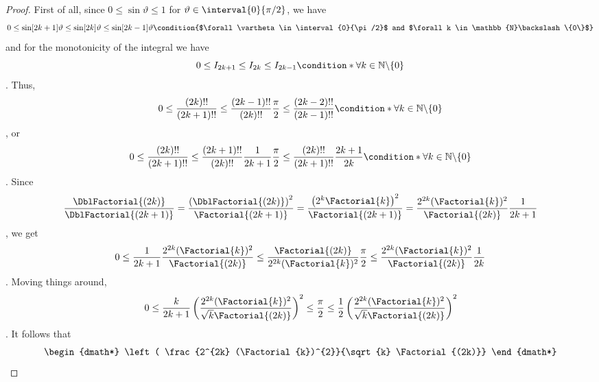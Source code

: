 \documentclass[onecolumn,a4paper,11pt]{article}
\newcommand{\numberset}{\mathbb}
\providecommand{\N}{\numberset{N}}
\theoremstyle{classicdef}
\theoremstyle{remark}
\begin{document}
\begin{proof}
First of all, since $0 \leq \sin\vartheta \leq 1 $ for $\vartheta \in
\interval{0}{\pi/2}$,  we have
\begin{dmath*}[compact]
   0 \leq \sin[2k+1]{\vartheta} \leq \sin[2k]{\vartheta} \leq
   \sin[2k-1]{\vartheta}
   \condition{$\forall \vartheta\in \interval{0}{\pi/2}$ and $\forall k \in
      \N\backslash\{0\}$}
\end{dmath*}
and for the monotonicity of the integral we have
\begin{dmath*}[compact]
0 \leq I_{2k+1} \leq I_{2k} \leq I_{2k-1}  
\condition*{\forall k \in \N\backslash\{0\}}
\end{dmath*}.
Thus,
\begin{dmath*}[compact]
0 \leq \frac{(2k)!!}{(2k+1)!!} \leq \frac{(2k-1)!!}{(2k)!!} \frac{\pi}{2} \leq
\frac{(2k-2)!!}{(2k-1)!!}  
\condition*{\forall k \in \N\backslash\{0\}}
\end{dmath*},
or 
\begin{dmath*}[compact]
0 \leq \frac{(2k)!!}{(2k+1)!!} \leq \frac{(2k+1)!!}{(2k)!!} \frac{1}{2k+1} \frac{\pi}{2} \leq
\frac{(2k)!!}{(2k+1)!!}  \frac{2k+1}{2k} 
\condition*{\forall k \in \N\backslash\{0\}}
\end{dmath*}.
Since
\begin{dmath*}[compact]
   \frac{\DblFactorial{(2k)}}{\DblFactorial{(2k+1)}} = \frac{\left(
	 \DblFactorial{(2k)}\right)^{2}}{\Factorial{(2k+1)}} = 
   \frac{
      \left( 2^{k} \Factorial{k} \right)^{2}}{\Factorial{(2k+1)}} = \frac{2^{2k}
      (\Factorial{k})^{2}}{\Factorial{(2k)}}
\frac{1}{2k+1} 
\end{dmath*},
we get
\begin{dmath*}[compact]
   0 \leq \frac{1}{2k+1} \frac{2^{2k} (\Factorial{k})^{2}}{\Factorial{(2k)}}
   \leq \frac{\Factorial{(2k)}}{2^{2k}
      (\Factorial{k})^{2}} \frac{\pi}{2} \leq \frac{2^{2k}
      (\Factorial{k})^{2}}{\Factorial{(2k)}} \frac{1}{2k} 
\end{dmath*}.
Moving things around,
\begin{dmath*}[compact]
   0 \leq \frac{k}{2k+1} \left( \frac{2^{2k} (\Factorial{k})^{2}}{\sqrt{k}
	 \Factorial{(2k)}} \right)^{2}
   \leq  \frac{\pi}{2} \leq \frac{1}{2}  \left( \frac{2^{2k} (\Factorial{k})^{2}}{\sqrt{k}
	 \Factorial{(2k)}} \right)^{2} 
\end{dmath*}.
It follows that
\begin{dgroup*}
   \begin{dmath*}
      \left( \frac{2^{2k} (\Factorial{k})^{2}}{\sqrt{k} \Factorial{(2k)}}

\end{dmath*}
\end{dgroup*}
\end{proof}
\end{document}
